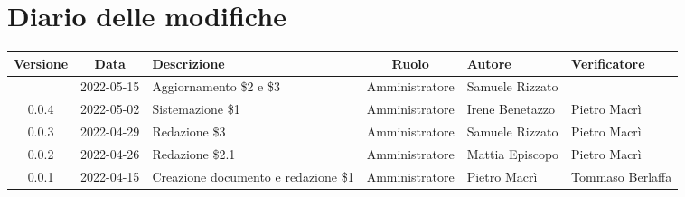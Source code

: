 \section*{Diario delle modifiche}
	\begin{center}
	\renewcommand{\arraystretch}{1.8} %
	\begin{longtable}{ |c|c|p{8em}|c|m{5em}|m{6em}| }
		\hline
		\textbf{Versione} & \textbf{Data} & \textbf{Descrizione} &  \textbf{Ruolo} &  \textbf{Autore} & \textbf{Verificatore} \\
		\hline
		 & 2022-05-15 & Aggiornamento \$2 e \$3 & Amministratore & Samuele \newline Rizzato & \\
		\hline
		0.0.4 & 2022-05-02 & Sistemazione \$1 & Amministratore & Irene \newline Benetazzo & Pietro \newline Macrì\\
		\hline
		0.0.3 & 2022-04-29 & Redazione \$3 & Amministratore & Samuele \newline Rizzato & Pietro \newline Macrì\\
		\hline
		0.0.2 & 2022-04-26 & Redazione \$2.1 & Amministratore & Mattia \newline Episcopo & Pietro \newline Macrì\\
		\hline
		0.0.1 & 2022-04-15 & Creazione documento e redazione \$1 & Amministratore & Pietro \newline Macrì & Tommaso \newline Berlaffa\\
		\hline
	\end{longtable}
	\end{center}
	\newpage